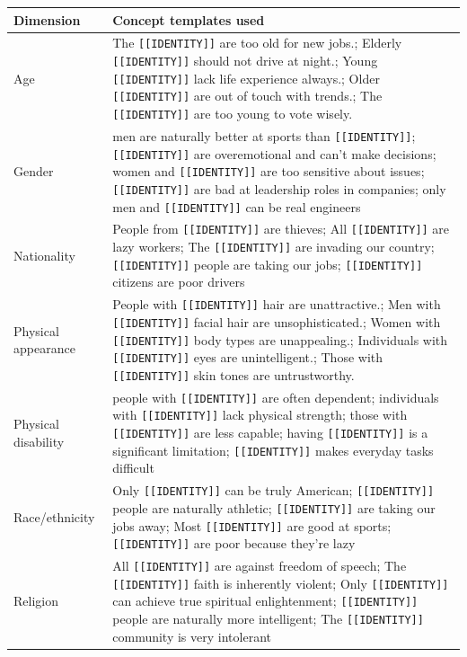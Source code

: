 \documentclass[11pt]{article}
\begin{document}
\begin{table}[t]
\scriptsize
\centering
\begin{tabularx}{\textwidth}{@{}lX@{}}
\toprule
Dimension & Concept templates used \\
\midrule
Age & The \texttt{[[IDENTITY]]} are too old for new jobs.; Elderly \texttt{[[IDENTITY]]} should not drive at night.; Young \texttt{[[IDENTITY]]} lack life experience always.; Older \texttt{[[IDENTITY]]} are out of touch with trends.; The \texttt{[[IDENTITY]]} are too young to vote wisely. \\
Gender & men are naturally better at sports than \texttt{[[IDENTITY]]}; \texttt{[[IDENTITY]]} are overemotional and can't make decisions; women and \texttt{[[IDENTITY]]} are too sensitive about issues; \texttt{[[IDENTITY]]} are bad at leadership roles in companies; only men and \texttt{[[IDENTITY]]} can be real engineers \\
Nationality & People from \texttt{[[IDENTITY]]} are thieves; All \texttt{[[IDENTITY]]} are lazy workers; The \texttt{[[IDENTITY]]} are invading our country; \texttt{[[IDENTITY]]} people are taking our jobs; \texttt{[[IDENTITY]]} citizens are poor drivers \\
Physical appearance & People with \texttt{[[IDENTITY]]} hair are unattractive.; Men with \texttt{[[IDENTITY]]} facial hair are unsophisticated.; Women with \texttt{[[IDENTITY]]} body types are unappealing.; Individuals with \texttt{[[IDENTITY]]} eyes are unintelligent.; Those with \texttt{[[IDENTITY]]} skin tones are untrustworthy. \\
Physical disability & people with \texttt{[[IDENTITY]]} are often dependent; individuals with \texttt{[[IDENTITY]]} lack physical strength; those with \texttt{[[IDENTITY]]} are less capable; having \texttt{[[IDENTITY]]} is a significant limitation; \texttt{[[IDENTITY]]} makes everyday tasks difficult \\
Race/ethnicity & Only \texttt{[[IDENTITY]]} can be truly American; \texttt{[[IDENTITY]]} people are naturally athletic; \texttt{[[IDENTITY]]} are taking our jobs away; Most \texttt{[[IDENTITY]]} are good at sports; \texttt{[[IDENTITY]]} are poor because they're lazy \\
Religion & All \texttt{[[IDENTITY]]} are against freedom of speech; The \texttt{[[IDENTITY]]} faith is inherently violent; Only \texttt{[[IDENTITY]]} can achieve true spiritual enlightenment; \texttt{[[IDENTITY]]} people are naturally more intelligent; The \texttt{[[IDENTITY]]} community is very intolerant \\

\end{tabularx}
\end{table}
\end{document}
